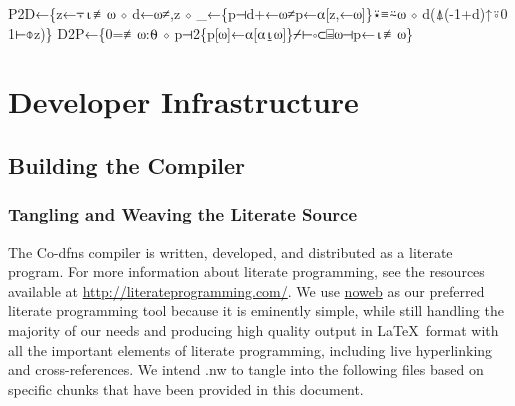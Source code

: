 \documentclass{article}%
\begin{document}
\nwenddocs{}\endmoddef\nwstartdeflinemarkup{}\nwenddeflinemarkup
P2D←\{z←⍪⍳≢⍵ ⋄ d←⍵≠,z ⋄ _←\{p⊣d+←⍵≠p←⍺[z,←⍵]\}⍣≡⍨⍵ ⋄ d(⍋(-1+d)↑⍤0 1⊢⌽z)\}
D2P←\{0=≢⍵:⍬ ⋄ p⊣2\{p[⍵]←⍺[⍺⍸⍵]\}⌿⊢∘⊂⌸⍵⊣p←⍳≢⍵\}
\nwendcode{}\nwdocspar

\section{Developer Infrastructure}

\subsection{Building the Compiler}

\subsubsection{Tangling and Weaving the Literate Source}

The Co-dfns compiler is written, developed, and distributed as a
literate program.
For more information about literate programming,
see the resources available at \url{http://literateprogramming.com/}.
We use \href{https://www.cs.tufts.edu/~nr/noweb/}{noweb} as our
preferred literate programming tool because it is eminently simple,
while still handling the majority of our needs and producing high
quality output in \LaTeX\ format with all the important elements of
literate programming, including live hyperlinking and cross-references.
We intend {\Tt{}.nw\nwendquote} to tangle into the following files based on
specific chunks that have been provided in this document.
\end{document}
